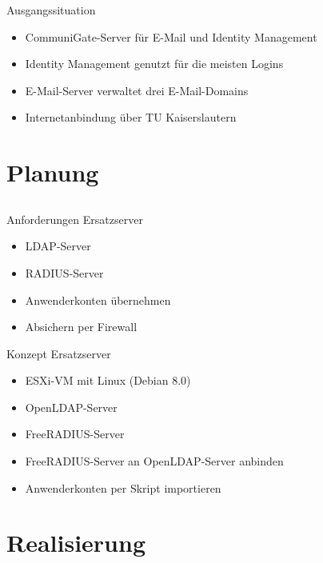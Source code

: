 \documentclass[presentation,svgnames,12pt]{beamer}
\begin{document}
\begin{frame}{Ausgangssituation}
\begin{itemize}
	\item CommuniGate-Server für E-Mail und Identity Management
	\item Identity Management genutzt für die meisten Logins
	\item E-Mail-Server verwaltet drei E-Mail-Domains
	\item Internetanbindung über TU Kaiserslautern
\end{itemize}
\end{frame}


\section{Planung}
\subsection{}
\begin{frame}{Anforderungen Ersatzserver}
\begin{itemize}
	\item LDAP-Server
	\item RADIUS-Server
	\item Anwenderkonten übernehmen
	\item Absichern per Firewall
\end{itemize}
\end{frame}

\begin{frame}{Konzept Ersatzserver}
\begin{itemize}
	\item ESXi-VM mit Linux (Debian 8.0)
	\item OpenLDAP-Server
	\item FreeRADIUS-Server
	\item FreeRADIUS-Server an OpenLDAP-Server anbinden
	\item Anwenderkonten per Skript importieren
\end{itemize}
\end{frame}


\section{Realisierung}
\end{document}
